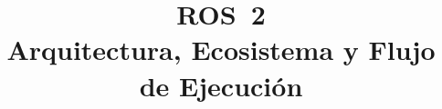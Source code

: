 \documentclass[conference]{IEEEtran}
\begin{document}
\title{ROS~2\\
Arquitectura, Ecosistema y Flujo de Ejecución}


\maketitle






















\clearpage


\end{document}
